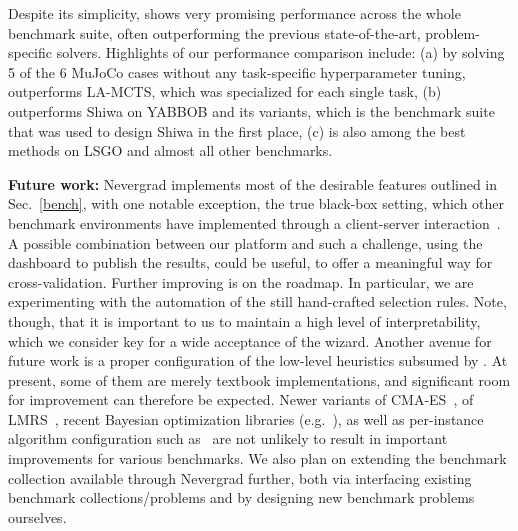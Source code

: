 Despite its simplicity, \ngoptq{} shows very promising performance across the whole benchmark suite, often outperforming the previous state-of-the-art, problem-specific solvers. Highlights of our performance comparison include: 
(a) by solving 5 of the 6 MuJoCo cases without any task-specific hyperparameter tuning, \ngoptq{} outperforms LA-MCTS, which was specialized for each single task, 
(b) \ngoptq{} outperforms Shiwa on YABBOB and its variants, which is the benchmark suite that was used to design Shiwa in the first place,  
(c) \ngoptq{} is also among the best methods on LSGO and almost all other benchmarks.

{\textbf{Future work:}} Nevergrad implements most of the desirable features outlined in Sec.~\ref{bench}, with one notable exception, the true black-box setting, which other benchmark environments have implemented through a client-server interaction~\cite{BBCOMP2017}. A possible combination between our platform and such a challenge, using the dashboard to publish the results, could be useful, to offer a meaningful way for cross-validation. 
Further improving \ngoptq{} is on the roadmap. In particular, we are experimenting with the  automation of the still hand-crafted selection rules. Note, though, that it is important to us to maintain a high level of interpretability, which we consider key for a wide acceptance of the wizard. Another avenue for future work is a proper configuration of the low-level heuristics subsumed by \ngoptq{}. At present, some of them are merely textbook implementations, and significant room for improvement can therefore be expected. Newer variants of CMA-ES~\cite{added1,added2,added3}, of LMRS~\cite{lmrs}, recent Bayesian optimization libraries (e.g.~\cite{turbo}), as well as per-instance algorithm configuration such as~\cite{nacim} are not unlikely to result in important improvements for various benchmarks. 
We also plan on extending the benchmark collection available through Nevergrad further, both via interfacing existing benchmark collections/problems and by designing new benchmark problems ourselves. 

